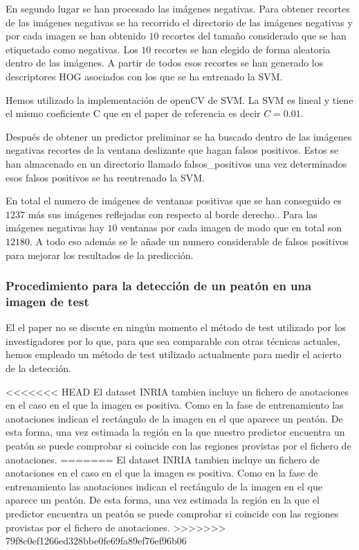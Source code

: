 \documentclass[a4paper,12pt]{article}
\begin{document}
En segundo lugar se han procesado las imágenes negativas. Para
obtener recortes de las imágenes negativas se ha recorrido el
directorio de las imágenes negativas y por cada imagen se han
obtenido $10$ recortes del tamaño considerado que se han etiquetado
como negativas. Los $10$ recortes se han elegido de forma aleatoria
dentro de las imágenes. A partir de todos esos recortes se han generado
los descriptores HOG asociados con los que se ha entrenado la SVM.

Hemos utilizado la implementación de openCV de SVM. La SVM es
lineal y tiene el mismo coeficiente C que en el paper de referencia
es decir $C = 0.01$.

Después de obtener un predictor preliminar se ha buscado dentro de las
imágenes negativas recortes de la ventana deslizante que hagan falsos
positivos. Estos se han almacenado en un directorio llamado falsos\_positivos
una vez determinados esos falsos positivos se ha reentrenado la SVM.

En total el numero de imágenes de ventanas positivas que se han
conseguido es $1237$ más sus imágenes reflejadas con respecto al borde derecho.. Para las imágenes negativas hay $10$ ventanas por
cada imagen de modo que en total son $12180$. A todo eso además se le añade
un numero considerable de falsos positivos para mejorar los resultados
de la predicción.

\subsubsection{Procedimiento para la detección de un peatón en una imagen de test}

El el paper no se discute en ningún momento el método de test utilizado por los investigadores por lo que, para que sea comparable con otras técnicas actuales, hemos empleado un método de test utilizado actualmente para medir el acierto de la detección.

<<<<<<< HEAD
El dataset INRIA tambien incluye un fichero de anotaciones en el caso en el que la imagen es positiva. Como en la fase de entrenamiento las anotaciones indican el rectángulo de la imagen en el que aparece un peatón. De esta forma, una vez estimada la región en la que nuestro predictor encuentra un peatón se puede comprobar si coincide con las regiones provistas por el fichero de anotaciones.
=======
El dataset INRIA tambien incluye un fichero de anotaciones en el caso en el que la imagen es positiva. Como en la fase de entrenamiento las anotaciones indican el rectángulo de la imagen en el que aparece un peatón. De esta forma, una vez estimada la región en la que el predictor encuentra un peatón se puede comprobar si coincide con las regiones provistas por el fichero de anotaciones. 
>>>>>>> 79f8c0ef1266ed328bbe0fe69fa89ef76ef96b06
\end{document}
